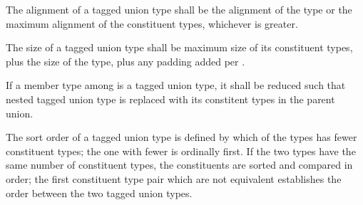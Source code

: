 \specsubsubitem
The alignment of a tagged union type shall be the alignment of the
 type or the maximum alignment of the constituent types, whichever
is greater.

\specsubsubitem
The size of a tagged union type shall be maximum size of its constituent types,
plus the size of the  type, plus any padding added per
.

\specsubsubitem
If a member type among  is a tagged union type, it
shall be reduced such that nested tagged union type is replaced with its
constitent types in the parent union.


\specsubsubitem
The sort order of a tagged union type is defined by which of the types has fewer
constituent types; the one with fewer is ordinally first. If the two types have
the same number of constituent types, the constituents are sorted and compared
in order; the first constituent type pair which are not equivalent establishes
the order between the two tagged union types.



\begin{grammar}
 \\
	\terminal{[} \terminal{]}  \\
	\terminal{[}  \terminal{]}  \\
	\terminal{[} \terminal{*} \terminal{]}  \\
\end{grammar}


\begin{grammar}
 \\
	  \\
\end{grammar}


\begin{grammar}
 \\
	 \\
\end{grammar}

